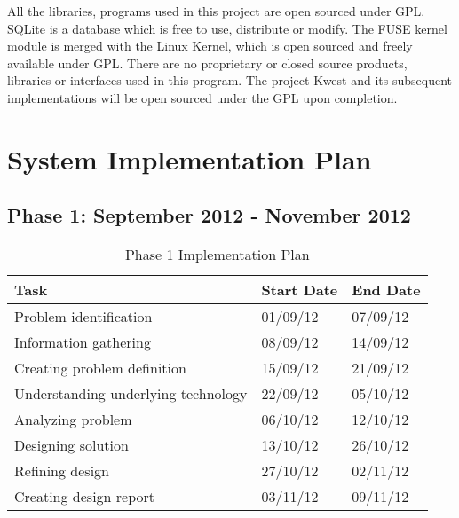 All the libraries, programs used in this project are open sourced under GPL. SQLite is a
database which is free to use, distribute or modify. The FUSE kernel module is merged
with the Linux Kernel, which is open sourced and freely available under GPL. There
are no proprietary or closed source products, libraries or interfaces used in this program.
The project Kwest and its subsequent implementations will be open sourced under the
GPL upon completion.



\section{System Implementation Plan}

\subsection*{Phase 1: September 2012 - November 2012}
\begin{table}[h]
\begin{tabular}{|p{7cm}|p{2cm}|p{2cm}|}
\hline
\textbf {Task} & \textbf {Start Date} & \textbf{End Date} \\ \hline
Problem identification & 01/09/12 & 07/09/12 \\ \hline
Information gathering & 08/09/12 & 14/09/12 \\ \hline
Creating problem definition & 15/09/12 & 21/09/12 \\ \hline
Understanding underlying technology & 22/09/12 & 05/10/12 \\ \hline
Analyzing problem & 06/10/12 & 12/10/12 \\ \hline
Designing solution & 13/10/12 & 26/10/12 \\ \hline
Refining design & 27/10/12 & 02/11/12 \\ \hline
Creating design report & 03/11/12 & 09/11/12 \\
\hline
\end{tabular}
\caption{Phase 1 Implementation Plan}
\label{tab:P1plan}
\end{table}

